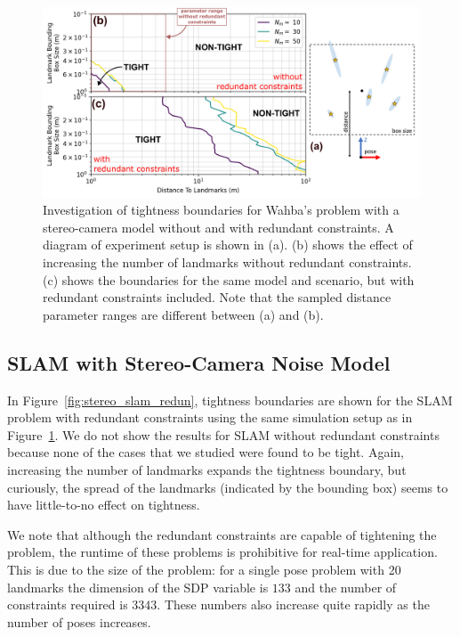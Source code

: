 \documentclass[lettersize,journal]{IEEEtran}
\begin{document}
\begin{figure}[!t]
	\centering
	\includegraphics[width=\columnwidth]{figs/stereo_redun_study}
	\caption{Investigation of tightness boundaries for Wahba's problem with a stereo-camera model without and with redundant constraints. A diagram of experiment setup is shown in (a). (b) shows the effect of increasing the number of landmarks without redundant constraints. (c) shows the boundaries for the same model and scenario, but with redundant constraints included. Note that the sampled distance parameter ranges are different between (a) and (b).}
	\label{fig:stereo_redun}
\end{figure}

\subsection{SLAM with Stereo-Camera Noise Model}\label{sec:SimStereoSLAM}

In Figure~\ref{fig:stereo_slam_redun}, tightness boundaries are shown for the SLAM problem with redundant constraints using the same simulation setup as in Figure~\ref{fig:stereo_redun}. We do not show the results for SLAM without redundant constraints because none of the cases that we studied were found to be tight. Again, increasing the number of landmarks expands the tightness boundary, but curiously, the spread of the landmarks (indicated by the bounding box) seems to have little-to-no effect on tightness.


We note that although the redundant constraints are capable of tightening the problem, the runtime of these problems is prohibitive for real-time application. This is due to the size of the problem: for a single pose problem with 20 landmarks the dimension of the SDP variable is $133$ and the number of constraints required is $3343$. These numbers also increase quite rapidly as the number of poses increases. 
\end{document}
